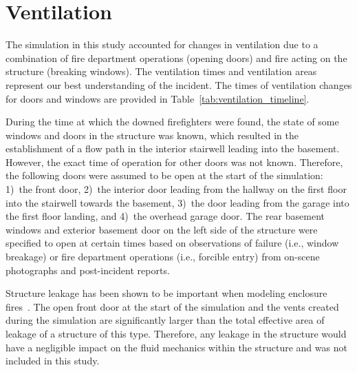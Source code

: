 \documentclass[12pt,oneside]{book}
\begin{document}
\section{Ventilation}
\label{sec:ventilation}

The simulation in this study accounted for changes in ventilation due to a combination of fire department operations (opening doors) and fire acting on the structure (breaking windows). The ventilation times and ventilation areas represent our best understanding of the incident. The times of ventilation changes for doors and windows are provided in Table~\ref{tab:ventilation_timeline}.

During the time at which the downed firefighters were found, the state of some windows and doors in the structure was known, which resulted in the establishment of a flow path in the interior stairwell leading into the basement. However, the exact time of operation for other doors was not known. Therefore, the following doors were assumed to be open at the start of the simulation: 1)~the front door, 2)~the interior door leading from the hallway on the first floor into the stairwell towards the basement, 3)~the door leading from the garage into the first floor landing, and 4)~the overhead garage door. The rear basement windows and exterior basement door on the left side of the structure were specified to open at certain times based on observations of failure (i.e., window breakage) or fire department operations (i.e., forcible entry) from on-scene photographs and post-incident reports.

Structure leakage has been shown to be important when modeling enclosure fires~\cite{beal2009}. The open front door at the start of the simulation and the vents created during the simulation are significantly larger than the total effective area of leakage of a structure of this type. Therefore, any leakage in the structure would have a negligible impact on the fluid mechanics within the structure and was not included in this study.
\end{document}
